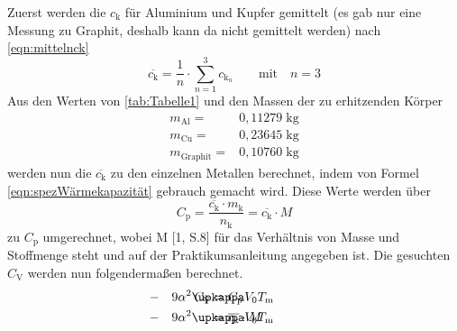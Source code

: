 \documentclass[titlepage = firstcover]{scrartcl}
\begin{document}
            \noindent
            Zuerst werden die $c_{\text{k}}$ für Aluminium und Kupfer gemittelt (es gab nur eine Messung zu Graphit, deshalb kann da nicht gemittelt werden)
            nach \eqref{eqn:mittelnck}
            \begin{equation*}
                \overline{c_{\text{k}}} = \frac{1}{n} \cdot \sum_{n=1}^3 c_{\text{k}_n} \qquad \text{mit} \quad n=3
            \end{equation*}
            Aus den Werten von \ref{tab:Tabelle1} und den Massen der zu erhitzenden Körper
            \begin{align*}
                m_{\text{Al}} =& 0,11279 \; \text{kg} \\
                m_{\text{Cu}} =& 0,23645 \; \text{kg} \\
                m_{\text{Graphit}} =& 0,10760 \; \text{kg}
            \end{align*}
            werden nun die $\overline{c_{\text{k}}}$ zu den einzelnen Metallen berechnet, indem von 
            Formel \eqref{eqn:spezWärmekapazität} gebrauch gemacht wird. Diese Werte werden über
            \begin{equation*}
                C_{\text{p}} = \frac{\overline{c_{\text{k}}} \cdot m_{\text{k}}}{n_{\text{k}}} = \overline{c_{\text{k}}} \cdot M
            \end{equation*} 
            zu $C_{\text{p}}$ umgerechnet, wobei M [1, S.8] für das Verhältnis von Masse und Stoffmenge steht und auf der Praktikumsanleitung angegeben ist. 
            Die gesuchten $C_{\text{V}}$ werden nun folgendermaßen berechnet.
            \begin{align}
                C_{\text{V}} &= C_{\text{p}} \hspace*{-3.5cm}&-\quad 9 \alpha^2 \upkappa  V_0 T_{\text{m}} \\
                \label{eqn:CV} 
                             &= \overline{c_{\text{k}}}\cdot M \hspace*{-3.5cm}&-\quad 9 \alpha^2 \upkappa  V_0 T_{\text{m}}
            \end{align}
            
\end{document}
